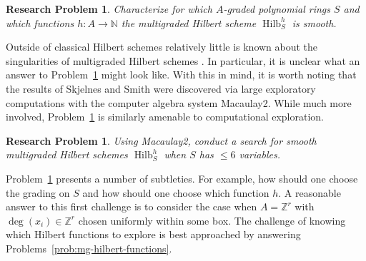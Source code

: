 \documentclass[11pt,reqno]{amsart}
\newtheorem{problem}[lemma]{Research Problem}
\theoremstyle{remark}
\newcommand{\Hilb}{\operatorname{Hilb}}
\newcommand{\N}{\mathbb{N}}
\newcommand{\Z}{\mathbb{Z}}
\newcommand{\juliette}[1]{{\color{red} \sf $\spadesuit\spadesuit\spadesuit$ Juliette: [#1]}}
\begin{document}

\begin{problem}\label{prob:smooth-mg-hilb} 
Characterize for which $A$-graded polynomial rings $S$ and which functions $h:A\to \N$ the multigraded Hilbert scheme $\Hilb^{h}_{S}$ is smooth. 
\end{problem}

Outside of classical Hilbert schemes relatively little is known about the singularities of multigraded Hilbert schemes \cite{maclaganSmith10,ramkumarSammartano22}. In particular, it is unclear what an answer to Problem~\ref{prob:smooth-mg-hilb} might look like. With this in mind, it is worth noting that the results of Skjelnes and Smith were discovered via large exploratory computations with the computer algebra system Macaulay2. While much more involved, Problem~\ref{prob:smooth-mg-hilb} is similarly amenable to computational exploration. %


\begin{problem}\label{prob:search-smooth-mg-hilb}
	Using Macaulay2, conduct a search for smooth multigraded Hilbert schemes $\Hilb_{S}^{h}$ when $S$ has $\leq 6$ variables.
\end{problem}

Problem~\ref{prob:search-smooth-mg-hilb} presents a number of subtleties. For example, how should one choose the grading on $S$ and how should one choose which function $h$. A reasonable answer to this first challenge is to consider the case when $A=\Z^{r}$ with $\deg(x_{i})\in\Z^{r}$ chosen uniformly within some box. The challenge of knowing which Hilbert functions to explore is best approached by answering Problems~\ref{prob:mg-hilbert-functions}. 
%
%
%
\end{document}
